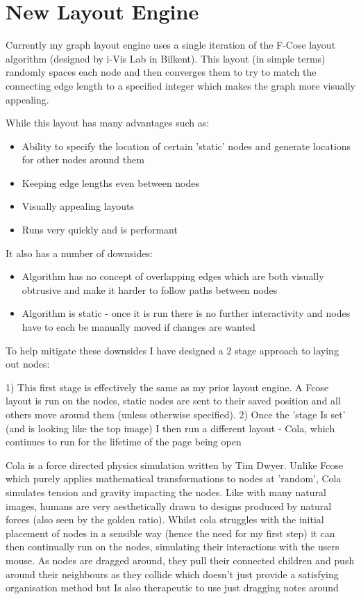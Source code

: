 \section{New Layout Engine}
\label{prototype:NewLayoutEngine}
Currently my graph layout engine uses a single iteration of the F-Cose layout algorithm (designed by  i-Vis Lab in Bilkent). This layout (in simple terms) randomly spaces each node and then converges them to try to match the connecting edge length to a specified integer which makes the graph more visually appealing. 

While this layout has many advantages such as:
\begin{itemize}
	\item Ability to specify the location of certain 'static' nodes and generate locations for other nodes around them
	\item Keeping edge lengths even between nodes
	\item Visually appealing layouts
	\item Runs very quickly and is performant
\end{itemize}

It also has a number of downsides:

\begin{itemize}
	\item Algorithm has no concept of overlapping edges which are both visually obtrusive and make it harder to follow paths between nodes
	\item Algorithm is static - once it is run there is no further interactivity and nodes have to each be manually moved if changes are wanted
\end{itemize}

To help mitigate these downsides I have designed a 2 stage approach to laying out nodes:

	1) This first stage is effectively the same as my prior layout engine. A Fcose layout is run on the nodes, static nodes are sent to their saved position and all others move around them (unless otherwise specified). 
	2) Once the 'stage Is set' (and is looking like the top image) I then run a different layout - Cola, which continues to run for the lifetime of the page being open

Cola is a force directed physics simulation written by Tim Dwyer. Unlike Fcose which purely applies mathematical transformations to nodes at 'random', Cola simulates tension and gravity impacting the nodes. Like with many natural images, humans are very aesthetically drawn to designs produced by natural forces (also seen by the golden ratio). Whilst cola struggles with the initial placement of nodes in a sensible way (hence the need for my first step) it can then continually run on the nodes, simulating their interactions with the users mouse. As nodes are dragged around, they pull their connected children and push around their neighbours as they collide which doesn’t just provide a satisfying organisation method but Is also therapeutic to use just dragging notes around

